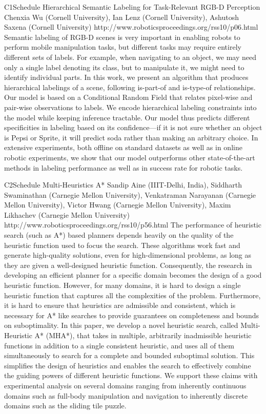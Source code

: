 \begin{spacing}{1.0}
\descriptionPaper
{C1}{Schedule}
{	
Hierarchical Semantic Labeling for Task-Relevant RGB-D Perception
}
{
Chenxia Wu (Cornell University), Ian Lenz (Cornell University), Ashutosh Saxena (Cornell University)
}
{
http://www.roboticsproceedings.org/rss10/p06.html
}
{
Semantic labeling of RGB-D scenes is very important in enabling robots to perform mobile manipulation tasks, but different tasks may require entirely different sets of labels. For example, when navigating to an object, we may need only a single label denoting its class, but to manipulate it, we might need to identify individual parts. In this work, we present an algorithm that produces hierarchical labelings of a scene, following is-part-of and is-type-of relationships. Our model is based on a Conditional Random Field that relates pixel-wise and pair-wise observations to labels. We encode hierarchical labeling constraints into the model while keeping inference tractable. Our model thus predicts different specificities in labeling based on its confidence---if it is not sure whether an object is Pepsi or Sprite, it will predict soda rather than making an arbitrary choice. In extensive experiments, both offline on standard datasets as well as in online robotic experiments, we show that our model outperforms other state-of-the-art methods in labeling performance as well as in success rate for robotic tasks.
}


\descriptionPaper
{C2}{Schedule}
{	
Multi-Heuristics A*
}
{
Sandip Aine (IIIT-Delhi, India), Siddharth Swaminathan (Carnegie Mellon University), Venkatraman Narayanan (Carnegie Mellon University), Victor Hwang (Carnegie Mellon University), Maxim Likhachev (Carnegie Mellon University)
}
{
http://www.roboticsproceedings.org/rss10/p56.html
}
{
The performance of heuristic search (such as A*) based planners depends heavily on the quality of the heuristic function used to focus the search. These algorithms work fast and generate high-quality solutions, even for high-dimensional problems, as long as they are given a well-designed heuristic function. Consequently, the research in developing an efficient planner for a specific domain becomes the design of a good heuristic function. However, for many domains, it is hard to design a single heuristic function that captures all the complexities of the problem. Furthermore, it is hard to ensure that heuristics are admissible and consistent, which is necessary for A* like searches to provide guarantees on completeness and bounds on suboptimality. In this paper, we develop a novel heuristic search, called Multi-Heuristic A* (MHA*), that takes in multiple, arbitrarily inadmissible heuristic functions in addition to a single consistent heuristic, and uses all of them simultaneously to search for a complete and bounded suboptimal solution. This simplifies the design of heuristics and enables the search to effectively combine the guiding powers of different heuristic functions. We support these claims with experimental analysis on several domains ranging from inherently continuous domains such as full-body manipulation and navigation to inherently discrete domains such as the sliding tile puzzle.
}




\end{spacing}
